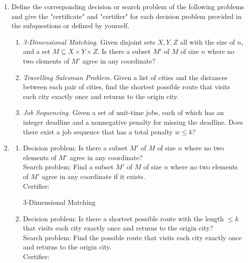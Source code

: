 \documentclass[12pt,a4paper]{article}
\makeatletter
\newtheorem*{solution}{Solution}
\theoremstyle{definition}
\renewenvironment{solution}[1][Solution] {\par\pushQED{\qed}\normalfont\topsep6\p@\@plus6\p@\relax\trivlist\item[\hskip\labelsep\bfseries#1\@addpunct{.}]\ignorespaces}{\popQED\endtrivlist\@endpefalse} \makeatother
\makeatother
\begin{document}
\begin{enumerate}
	\item Define the corresponding decision or search problem of the following problems and give the "certificate" and "certifier" for each decision problem provided in the subquestions or defined by yourself.
	
	\begin{enumerate}
	    \item
	    \textit{3-Dimensional Matching.}  Given disjoint sets $X,Y,Z$ all with the size of $n$, and a set $M \subseteq X\times Y\times Z$.  Is there a subset $M'$ of $M$ of size $n$ where no two elements of $M'$ agree in any coordinate?
	    
	    \item 
	    \textit{Travelling Salesman Problem.} Given a list of cities and the distances between each pair of cities, find the shortest possible route that visits each city exactly once and returns to the origin city.
	    
	    \item
	    \textit{Job Sequencing.} Given a set of unit-time jobs, each of which has an integer deadline and a nonnegative penalty for missing the deadline. Does there exist a job sequence that has a total penalty $w\leqslant k$?
	    
	\end{enumerate}

	\begin{solution}
		\begin{enumerate}
			\item Decision problem: Is there a subset $M'$ of $M$ of size $n$ where no two elements of $M'$ agree in any coordinate?\\
			Search problem: Find a subset $M'$ of $M$ of size $n$ where no two elements of $M'$ agree in any coordinate if it exists.\\
			Certifier: \\\begin{algorithm}[H]
				
				\BlankLine
				\caption{3-Dimensional Matching}\label{3-Dimensional Matching}
	
				\;
	
			\end{algorithm}

			\item Decision problem: Is there a shortest possible route with the length $\leq k$ that visits each city exactly once and returns to the origin city?\\
			Search problem: Find the possible route that visits each city exactly once and returns to the origin city.\\
			Certifier: \\\begin{algorithm}[H]
				

\end{algorithm}
\end{enumerate}
\end{solution}
\end{enumerate}
\end{document}
